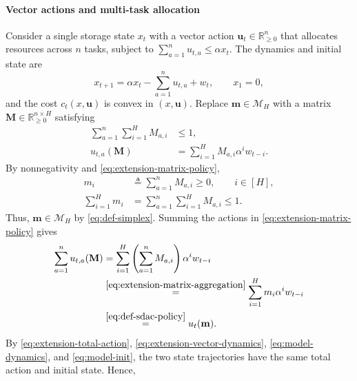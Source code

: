 \documentclass[journal]{IEEEtran}
\theoremstyle{remark}
\begin{document}
\paragraph{Vector actions and multi-task allocation}
Consider a single storage state $x_t$ with a vector action
$\mathbf{u}_t\in\mathbb{R}_{\ge0}^n$ that allocates resources across $n$ tasks,
subject to $\sum_{a=1}^n u_{t,a}\le\alpha x_t$. The dynamics and initial state are
\begin{equation}
\label{eq:extension-vector-dynamics}
x_{t+1}=\alpha x_t-\sum_{a=1}^n u_{t,a}+w_t,\qquad x_1=0,
\end{equation}
and the cost
$c_t(x,\mathbf{u})$ is convex in $(x,\mathbf{u})$. Replace
$\mathbf{m}\in\mathcal{M}_H$ with a matrix
$\mathbf{M}\in\mathbb{R}_{\ge0}^{n\times H}$ satisfying
\begin{equation}
\label{eq:extension-matrix-policy}
\begin{aligned}
\sum_{a=1}^n\sum_{i=1}^H M_{a,i}&\le1,\\
u_{t,a}(\mathbf{M})&=\sum_{i=1}^H M_{a,i}\alpha^i w_{t-i}.
\end{aligned}
\end{equation}
By nonnegativity and \eqref{eq:extension-matrix-policy},
\begin{equation}
\label{eq:extension-matrix-aggregation}
\begin{aligned}
m_i&\triangleq\sum_{a=1}^n M_{a,i}\ge0,\qquad i\in[H],\\
\sum_{i=1}^H m_i
&=\sum_{a=1}^n\sum_{i=1}^H M_{a,i}\le1.
\end{aligned}
\end{equation}
Thus, $\mathbf{m}\in\mathcal{M}_H$ by \eqref{eq:def-simplex}.
Summing the actions in \eqref{eq:extension-matrix-policy} gives
\begin{equation}
\label{eq:extension-total-action}
\begin{aligned}
\sum_{a=1}^n u_{t,a}(\mathbf{M})
&=\sum_{i=1}^H\left(\sum_{a=1}^n M_{a,i}\right)\alpha^i w_{t-i}\\
&\overset{\eqref{eq:extension-matrix-aggregation}}{=}
\sum_{i=1}^H m_i\alpha^i w_{t-i}\\
&\overset{\eqref{eq:def-sdac-policy}}{=}u_t(\mathbf{m}).
\end{aligned}
\end{equation}
By \eqref{eq:extension-total-action}, \eqref{eq:extension-vector-dynamics},
\eqref{eq:model-dynamics}, and \eqref{eq:model-init}, the two state
trajectories have the same total action and initial state. Hence,
\end{document}
